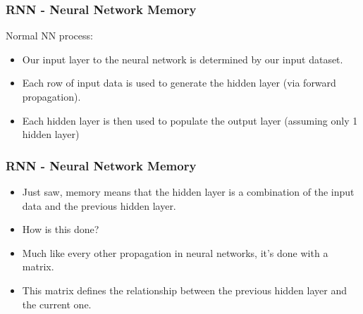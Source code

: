 \begin{frame}[fragile] \frametitle{RNN - Neural Network Memory}
Normal NN process:
\begin{itemize}
\item Our input layer to the neural network is determined by our input dataset. 
\item Each row of input data is used to generate the hidden layer (via forward propagation). 
\item Each hidden layer is then used to populate the output layer (assuming only 1 hidden layer)
\end{itemize}
\end{frame}


\begin{frame}[fragile] \frametitle{RNN - Neural Network Memory}
\begin{itemize}
\item Just saw, memory means that the hidden layer is a combination of the input data and the previous hidden layer. 
\item How is this done?
\item Much like every other propagation in neural networks, it's done with a matrix. 
\item This matrix defines the relationship between the previous hidden layer and the current one.
\end{itemize}
\end{frame}


